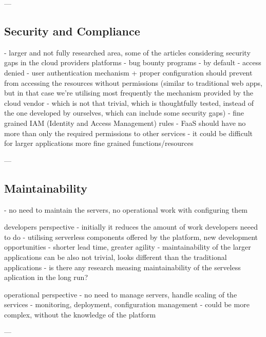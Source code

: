---

\subsection*{Security and Compliance}

- larger and not fully researched area, some of the articles considering security gaps in the cloud providers platforms - bug bounty programs
- by default - access denied
- user authentication mechanism + proper configuration should prevent from accessing the resources without permissions (similar to traditional web apps, but in that case we're utilising most frequently the mechanism provided by the cloud vendor - which is not that trivial, which is thoughtfully tested, instead of the one developed by ourselves, which can include some security gaps)
- fine grained IAM (Identity and Access Management) rules - FaaS should have no more than only the required permissions to other services - it could be difficult for larger applications more fine grained functions/resources

---

\subsection*{Maintainability}

- no need to maintain the servers, no operational work with configuring them

developers perspective
- initially it reduces the amount of work developers neeed to do - utilising serverless components offered by the platform, new development opportunities - shorter lead time, greater agility
- maintainability of the larger applications can be also not trivial, looks different than the traditional applications - is there any research measing maintainability of the serveless aplication in the long run?

operational perspective
- no need to manage servers, handle scaling of the services
- monitoring, deployment, configuration management - could be more complex, without the knowledge of the platform

---


